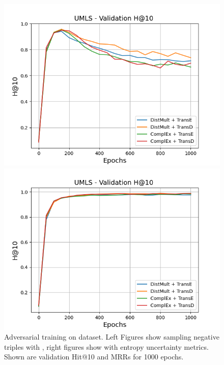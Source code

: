 \begin{figure}
\begin{minipage}{.5\textwidth}
    \end{minipage}
    \begin{minipage}{.5\textwidth}
      \centering
      \includegraphics[width=0.9\linewidth]{figures/results/gan_train/not_pretrained/random/umls/random_umls_hit10.png}
    \end{minipage}%
    \begin{minipage}{.5\textwidth}
      \centering
      \includegraphics[width=0.9\linewidth]{figures/results/gan_train/not_pretrained/uncertainty/max_distribution/entropy/umls/uncertainty_umls_hit10.png}
    \end{minipage}%
    \caption{Adversarial training on \umls dataset. 
    Left Figures show sampling negative triples with \origsampling, right figures show \ussoftmax with entropy uncertainty metrics.
    Shown are validation Hit@10 and MRRs for 1000 epochs.}
    \label{fig:advtrain_umls_random_vs_uncertainty}
\end{figure}

